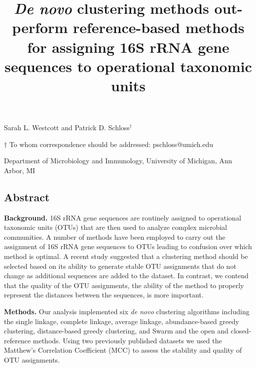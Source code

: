 \documentclass[11pt,]{article}
\title{\textbf{\emph{De novo} clustering methods out-perform reference-based
methods for assigning 16S rRNA gene sequences to operational taxonomic
units}}
\author{}
\date{}
\begin{document}
\maketitle

\begin{center}
\vspace{25mm}
Sarah L. Westcott and Patrick D. Schloss${^\dagger}$

\vspace{30mm}

$\dagger$ To whom correspondence should be addressed: pschloss@umich.edu

Department of Microbiology and Immunology, University of Michigan, Ann Arbor, MI
\end{center}

\newpage

\linenumbers

\subsection{Abstract}\label{abstract}

\textbf{Background.} 16S rRNA gene sequences are routinely assigned to
operational taxonomic units (OTUs) that are then used to analyze complex
microbial communities. A number of methods have been employed to carry
out the assignment of 16S rRNA gene sequences to OTUs leading to
confusion over which method is optimal. A recent study suggested that a
clustering method should be selected based on its ability to generate
stable OTU assignments that do not change as additional sequences are
added to the dataset. In contrast, we contend that the quality of the
OTU assignments, the ability of the method to properly represent the
distances between the sequences, is more important.

\textbf{Methods.} Our analysis implemented six \emph{de novo} clustering
algorithms including the single linkage, complete linkage, average
linkage, abundance-based greedy clustering, distance-based greedy
clustering, and Swarm and the open and closed-reference methods. Using
two previously published datasets we used the Matthew's Correlation
Coefficient (MCC) to assess the stability and quality of OTU
assignments.
\end{document}
